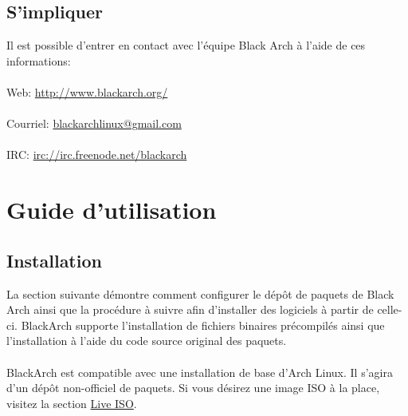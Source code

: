 \documentclass[a4paper, oneside, 11pt]{book}
\begin{document}


\section{S'impliquer}
Il est possible d'entrer en contact avec l'équipe Black Arch à l'aide de ces
informations:
\\\\
Web: \url{http://www.blackarch.org/}
\\\\
Courriel: \href{mailto:blackarchlinux@gmail.com}{blackarchlinux@gmail.com}
\\\\
IRC: \url{irc://irc.freenode.net/blackarch}


\chapter{Guide d'utilisation}

\section{Installation}
La section suivante démontre comment configurer le dépôt de paquets de Black 
Arch ainsi que la procédure à suivre afin d'installer des logiciels à partir de 
celle-ci. BlackArch supporte l'installation de fichiers binaires précompilés 
ainsi que l'installation à l'aide du code source original des paquets.
\\\\
BlackArch est compatible avec une installation de base d'Arch Linux. Il s'agira 
d'un dépôt non-officiel de paquets. Si vous désirez une image ISO à la place,
visitez la section \href{http://www.blackarch.org/download.html#iso}{Live ISO}.
\\\\
\end{document}
